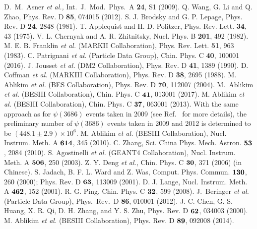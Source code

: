 \documentclass[twocolumn,showpacs,aps,prd]{revtex4-1}
\newcommand{\psip}{\psi(3686)}
\begin{document}
%
\begin{thebibliography}{**}
   D.~M.~Asner {\it et al.,} Int.\ J.\ Mod.\ Phys.\ A {\bf 24}, S1 (2009).
  Q. Wang, G. Li and Q. Zhao, Phys. Rev. D {\bf 85}, 074015 (2012).
  S. J. Brodsky and G. P. Lepage, Phys. Rev. D {\bf 24}, 2848 (1981).
   T. Applequist and H. D. Politzer, Phys. Rev. Lett. {\bf 34}, 43 (1975).
   V. L. Chernyak and A. R. Zhitnitsky, Nucl. Phys. B {\bf201}, 492 (1982).
   M. E. B. Franklin {\it et al.} (MARKII Collaboration), Phys. Rev. Lett. {\bf 51}, 963 (1983).
   C. Patrignani {\it et al.} (Particle Data Group), Chin. Phys. C {\bf 40}, 100001 (2016).
   J. Jousset {\it et al.} (DM2 Collaboration), Phys. Rev. D {\bf 41}, 1389 (1990).
   D. Coffman {\it et al.} (MARKIII Collaboration), Phys. Rev. D {\bf 38}, 2695 (1988).
   M. Ablikim {\it et al.} (BES Collaboration), Phys. Rev. D {\bf 70}, 112007 (2004).
   M.~Ablikim {\it et al.} (BESIII Collaboration), Chin. Phys. C $\bf{41}$, 013001 (2017).
   M. Ablikim {\it et al.} (BESIII Collaboration), Chin. Phys. C $\bf{37}$, 063001 (2013).
   With the same approach as for $\psip$ events taken in 2009 (see Ref.~\cite{psipnumber09} for more details), the preliminary number of $\psip$ events taken in 2009 and 2012 is determined to be $(448.1\pm2.9)\times10^{6}$.
   M. Ablikim {\it et al.} (BESIII Collaboration), Nucl. Instrum. Meth. A $\bf{614}$, 345 (2010).
   C. Zhang, Sci. China Phys. Mech. Astron. $\bf{53}$, 2084 (2010).
   S. Agostinelli {\it et al.} (GEANT4 Collaboration), Nucl. Instrum. Meth. A $\bf{506}$, 250 (2003).
   Z. Y. Deng {\it et al.}, Chin. Phys. C $\bf{30}$, 371 (2006) (in Chinese).
   S. Jadach, B. F. L. Ward and Z. Was, Comput. Phys. Commun. $\bf{130}$, 260 (2000); Phys. Rev. D $\bf{63}$, 113009 (2001).
   D. J. Lange, Nucl. Instrum. Meth. A $\bf{462}$, 152 (2001).
   R. G. Ping, Chin. Phys. C $\bf{32}$, 599 (2008).
   J.~Beringer {\it et al.} (Particle Data Group), Phys.\ Rev.\ D {\bf 86}, 010001 (2012).
  J. C. Chen, G. S. Huang, X. R. Qi, D. H. Zhang, and Y. S. Zhu, Phys. Rev. D $\bf{62}$, 034003 (2000).
   M. Ablikim {\it et al.} (BESIII Collaboration), Phys. Rev. D $\bf{89}$, 092008 (2014).

\end{thebibliography}
\end{document}
